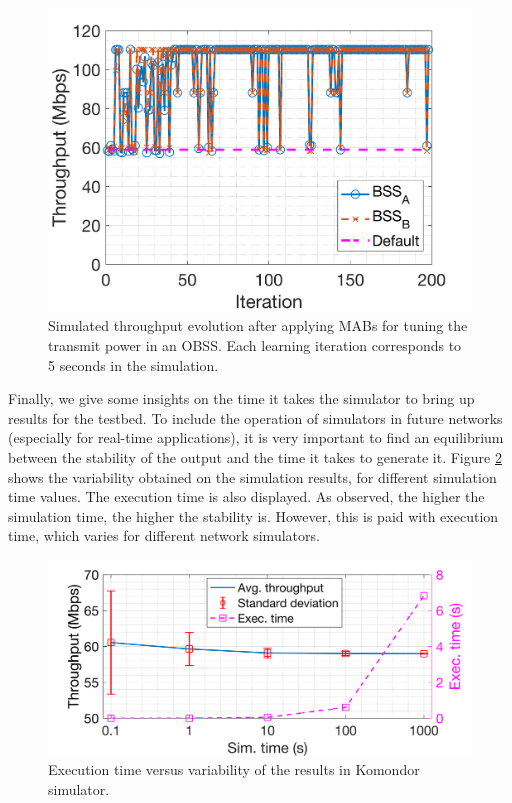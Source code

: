 \documentclass[journal]{IEEEtran}
\begin{document}
	\begin{figure}[ht!]
	\centering
	\includegraphics[width=0.8\columnwidth]{throughput_evolution_komondor.png}
	\caption{Simulated throughput evolution after applying MABs for tuning the transmit power in an OBSS. Each learning iteration corresponds to 5 seconds in the simulation.}
	\label{fig:results_komondor}
	\end{figure}
	
	Finally, we give some insights on the time it takes the simulator to bring up results for the testbed. To include the operation of simulators in future networks (especially for real-time applications), it is very important to find an equilibrium between the stability of the output and the time it takes to generate it. Figure \ref{fig:test_sim_time_vs_accuracy} shows the variability obtained on the simulation results, for different simulation time values. The execution time is also displayed. As observed, the higher the simulation time, the higher the stability is. However, this is paid with execution time, which varies for different network simulators. 
	
	\begin{figure}[ht!]
		\centering
		\includegraphics[width=0.9\columnwidth]{test_sim_time_vs_accuracy.png}
		\caption{Execution time versus variability of the results in Komondor simulator.}
		\label{fig:test_sim_time_vs_accuracy}
	\end{figure}
\end{document}
